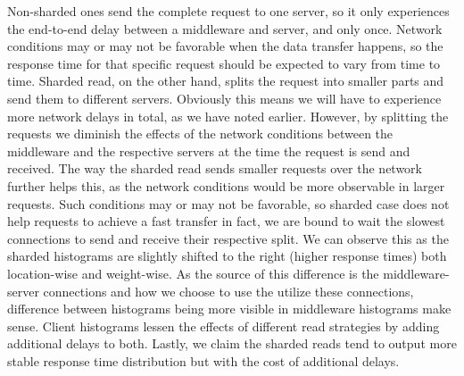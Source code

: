 \documentclass[11pt,a4paper]{article}
\begin{document}
\par Non-sharded ones send the complete request to one server, so it only experiences the end-to-end delay between a middleware and server, and only once. Network conditions may or may not be favorable when the data transfer happens, so the response time for that specific request should be expected to vary from time to time. Sharded read, on the other hand, splits the request into smaller parts and send them to different servers. Obviously this means we will have to experience more network delays in total, as we have noted earlier. However, by splitting the requests we diminish the effects of the network conditions between the middleware and the respective servers at the time the request is send and received. The way the sharded read sends smaller requests over the network further helps this, as the network conditions would be more observable in larger requests. Such conditions may or may not be favorable, so sharded case does not help requests to achieve a fast transfer \textemdash in fact, we are bound to wait the slowest connections to send and receive their respective split. We can observe this as the sharded histograms are slightly shifted to the right (higher response times) both location-wise and weight-wise. As the source of this difference is the middleware-server connections and how we choose to use the utilize these connections, difference between histograms being more visible in middleware histograms make sense. Client histograms lessen the effects of different read strategies by adding additional delays to both. Lastly, we claim the sharded reads tend to output more stable response time distribution but with the cost of additional delays.

\end{document}
